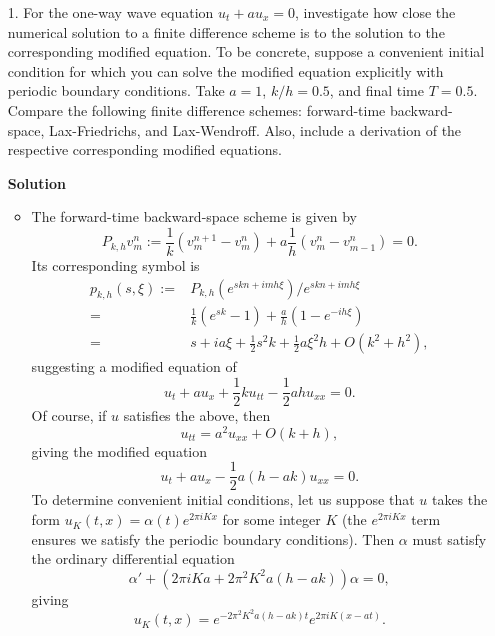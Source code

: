 \documentclass{article}
\begin{document}
\begin{itemize}

\item[1.] For the one-way wave equation $u_t + a u_x = 0$, investigate how close the numerical solution to a finite difference scheme is to the solution to the corresponding modified equation. To be concrete, suppose a convenient initial condition for which you can solve the modified equation explicitly with periodic boundary conditions. Take $a = 1$, $k/h = 0.5$, and final time $T = 0.5$. Compare the following finite difference schemes: forward-time backward-space, Lax-Friedrichs, and Lax-Wendroff. Also, include a derivation of the respective corresponding modified equations.

\textbf{Solution}

\begin{itemize}

\item The forward-time backward-space scheme is given by
\begin{equation*}
P_{k,h} v^n_m := \frac{1}{k} \left( v^{n+1}_m - v^n_m \right) + a \frac{1}{h} \left( v^n_m - v^n_{m-1} \right) = 0.
\end{equation*}
Its corresponding symbol is
\begin{align*}
p_{k,h}(s,\xi) := {} & P_{k,h} \left( e^{skn + imh\xi} \right) / e^{skn + imh\xi} \\
                = {} & \frac{1}{k} \left( e^{sk} - 1 \right) + \frac{a}{h} \left( 1 - e^{-ih\xi} \right) \\
                = {} & s + i a \xi + \frac{1}{2} s^2 k + \frac{1}{2} a \xi^2 h + O \left( k^2 + h^2 \right),
\end{align*}
suggesting a modified equation of
\begin{equation*}
u_t + a u_x + \frac{1}{2} k u_{tt} - \frac{1}{2} ah u_{xx} = 0.
\end{equation*}
Of course, if $u$ satisfies the above, then
\begin{equation*}
u_{tt} = a^2 u_{xx} + O \left( k + h \right),
\end{equation*}
giving the modified equation
\begin{equation*}
u_t + a u_x - \frac{1}{2} a \left( h - ak \right) u_{xx} = 0.
\end{equation*}
To determine convenient initial conditions, let us suppose that $u$ takes the form $u_K(t,x) = \alpha(t) e^{2\pi iKx}$ for some integer $K$ (the $e^{2\pi iKx}$ term ensures we satisfy the periodic boundary conditions). Then $\alpha$ must satisfy the ordinary differential equation
\begin{equation*}
\alpha' + \left( 2 \pi i K a + 2 \pi^2 K^2 a \left( h - ak \right) \right) \alpha = 0,
\end{equation*}
giving
\begin{equation*}
u_K(t,x) = e^{-2 \pi^2 K^2 a \left( h - ak \right) t} e^{2 \pi i K \left( x - a t \right)}.
\end{equation*}


\end{itemize}
\end{itemize}
\end{document}
